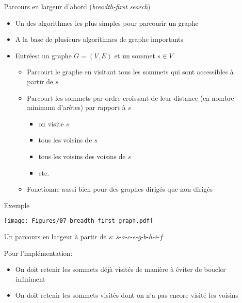 \begin{frame}{Parcours en largeur d'abord ({\it breadth-first search})}
\begin{itemize}
\item Un des algorithmes les plus simples pour parcourir un graphe
\item A la base de plusieurs algorithmes de graphe importants%

\bigskip

\item Entrées: un graphe $G=(V,E)$ et un sommet $s\in V$
\begin{itemize}
\item Parcourt le graphe en visitant tous les sommets qui sont accessibles à partir de $s$
\item Parcourt les sommets par ordre croissant de leur distance (en
  nombre minimum d'arêtes) par rapport à $s$
\begin{itemize}
\item on visite $s$
\item tous les voisins de $s$
\item tous les voisins des voisins de $s$
\item etc.
\end{itemize}
\item Fonctionne aussi bien pour des graphes dirigés que non dirigés
\end{itemize}
\end{itemize}

\end{frame}

\begin{frame}{Exemple}

\centerline{\texttt{[image: Figures/07-breadth-first-graph.pdf]}}
Un parcours en largeur à partir de $s$: $s$-$a$-$c$-$e$-$g$-$b$-$h$-$i$-$f$

\bigskip

Pour l'implémentation:
\begin{itemize}
\item On doit retenir les sommets déjà visités de manière à éviter de
  boucler infiniment
\item On doit retenir les sommets visités dont on n'a pas encore
  visité les voisins
\end{itemize}

\end{frame}

